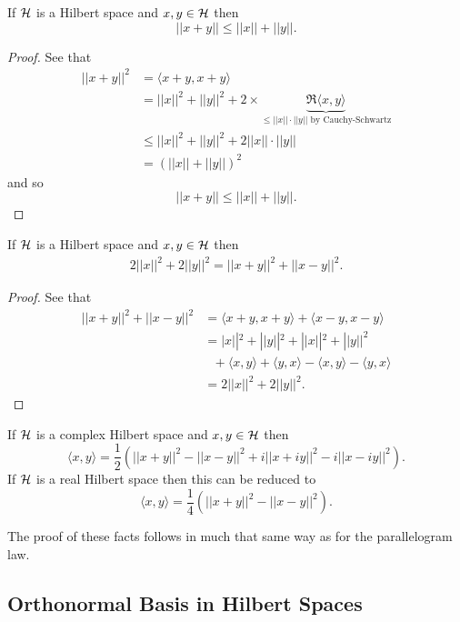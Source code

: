\documentclass{unswmaths}
\begin{document}
\begin{theorem}
	If $ \mathcal{H} $ is a Hilbert space and $ x, y \in \mathcal{H} $ then
	$$
		||x + y|| \leq ||x|| + ||y||.
	$$
\end{theorem}
\begin{proof}
	See that
	\begin{align*}
		||x + y||^2 &= \langle x + y, x +y \rangle \\
			&= ||x||^2 + ||y||^2 + 2 \times \underbrace{\Re{\langle x, y \rangle}}_{ \leq ||x||\cdot||y|| \text{ by Cauchy-Schwartz} } \\
			&\leq ||x||^2 + ||y||^2 + 2||x||\cdot||y|| \\
			&= (||x|| + ||y||)^2
	\end{align*}
	and so
	$$
		||x + y|| \leq ||x|| + ||y||.
	$$
\end{proof}

\begin{theorem}
If $ \mathcal{H} $ is a Hilbert space and $ x, y \in \mathcal{H} $ then
\begin{align*}
	2||x||^2 + 2||y||^2 = ||x+y||^2 + ||x-y||^2.
\end{align*}
\end{theorem}
\begin{proof}
	See that
	\begin{align*}
		||x+y||^2 + ||x-y||^2 &= \langle x + y, x+y \rangle + \langle x - y, x -y \rangle \\
			&= |x||^2 + ||y||^2 + ||x||^2 + ||y||^2 \\
			& \ \ \ + \langle x, y \rangle + \langle y, x \rangle - \langle x, y \rangle - \langle y, x \rangle \\
			&= 2||x||^2 + 2||y||^2.
	\end{align*}
\end{proof}

\begin{theorem}
	If $ \mathcal{H} $ is a complex Hilbert space and $ x, y \in \mathcal{H} $ then
	$$
		\langle x, y \rangle = \frac{1}{2} \left( ||x+y||^2 - ||x-y||^2 + i||x+iy||^2 - i||x-iy||^2 \right).
	$$
	If $ \mathcal{H} $ is a real Hilbert space then this can be reduced to 
	$$
		\langle x, y \rangle = \frac{1}{4} \left( ||x+y||^2 - ||x-y||^2 \right).
	$$
\end{theorem}
The proof of these facts follows in much that same way as for the parallelogram law.

\subsection*{Orthonormal Basis in Hilbert Spaces}
\end{document}
